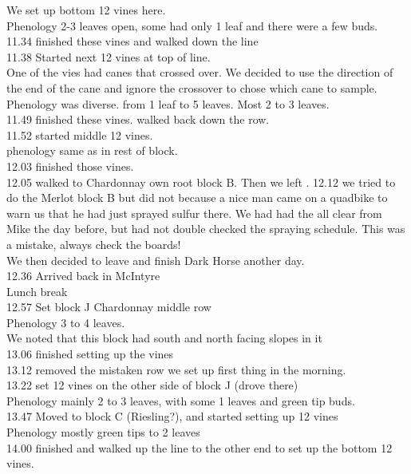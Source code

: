 \documentclass[11pt,letter]{article}
\newenvironment{smitemize}{
\begin{itemize}
  \setlength{\itemsep}{0pt}
  \setlength{\parskip}{0.8pt}
  \setlength{\parsep}{0pt}}
{\end{itemize}
}
\begin{document}
\begin{smitemize}
We set up bottom 12 vines here.\\
Phenology 2-3 leaves open, some had only 1 leaf and there were a few buds. \\
11.34 finished these vines and walked down the line \\
11.38 Started next 12 vines at top of line. \\
One of the vies had canes that crossed over. We decided to use the direction of the end of the cane and ignore the crossover to chose which cane to sample. \\
Phenology was diverse. from 1 leaf to 5 leaves. Most 2 to 3 leaves. \\
11.49 finished these vines. walked back down the row. \\
11.52 started middle 12 vines. \\
phenology same as in rest of block. \\
12.03 finished those vines. \\
12.05 walked to Chardonnay own root block B. Then we left .
12.12 we tried to do the Merlot block B but did not because a nice man came on a quadbike to warn us that he had just sprayed sulfur there. We had had the all clear from Mike the day before, but had not double checked the spraying schedule. This was a mistake, always check the boards!\\
We then decided to leave and finish Dark Horse another day. \\
12.36 Arrived back in McIntyre\\
Lunch break\\
12.57 Set block J Chardonnay middle row \\
Phenology 3 to 4 leaves. \\
We noted that this block had south and north facing slopes in it \\
13.06 finished setting up the vines \\
13.12 removed the mistaken row we set up first thing in the morning.\\
13.22 set 12 vines on the other side of block J (drove there)\\
Phenology mainly 2 to 3 leaves, with some 1 leaves and green tip buds. \\
13.47 Moved to block C (Riesling?), and started setting up 12 vines \\
Phenology mostly green tips to 2 leaves \\
14.00 finished and walked up the line to the other end to set up the bottom 12 vines. \\

\end{smitemize}
\end{document}
